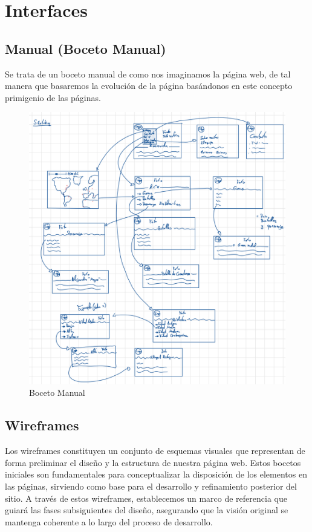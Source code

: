 \documentclass{article}
\begin{document}
\newpage

\section{Interfaces}

\subsection{Manual (Boceto Manual)}

Se trata de un boceto manual de como nos imaginamos la página web, de tal manera que basaremos la evolución de la página basándonos en este concepto primigenio de las páginas.

\begin{figure}[H]
    \centering
    \includegraphics[width=1\textwidth]{Esquemas/Sketch.PNG}
    \caption{Boceto Manual}
    \label{fig:mi_imagen}
\end{figure}

\newpage

\subsection{Wireframes}

Los wireframes constituyen un conjunto de esquemas visuales que representan de forma preliminar el diseño y la estructura de nuestra página web. Estos bocetos iniciales son fundamentales para conceptualizar la disposición de los elementos en las páginas, sirviendo como base para el desarrollo y refinamiento posterior del sitio. A través de estos wireframes, establecemos un marco de referencia que guiará las fases subsiguientes del diseño, asegurando que la visión original se mantenga coherente a lo largo del proceso de desarrollo.
\end{document}
